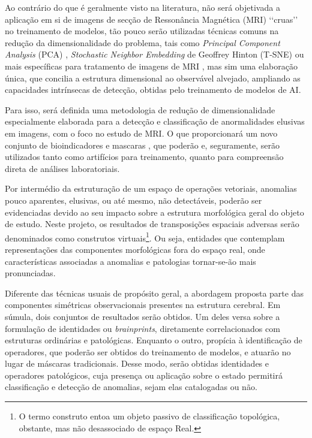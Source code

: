 \documentclass[a4paper, 12pt]{report}
\begin{document}
Ao contrário do que é geralmente visto na literatura, não será objetivada a aplicação em si de imagens de secção de Ressonância Magnética (MRI) {\lq\lq}cruas{\rq\rq} no treinamento de modelos, tão pouco serão utilizadas técnicas comuns na redução da dimensionalidade do problema, tais como \textit{Principal Component Analysis} (PCA) \cite{JolliffePrincipal2016Apr}, \textit{Stochastic Neighbor Embedding} de Geoffrey Hinton (T-SNE) \cite{VanderMaaten2008} ou mais específicas para tratamento de imagens de MRI \cite{Plis2014}, mas sim uma elaboração única, que concilia a estrutura dimensional ao observável alvejado, ampliando as capacidades intrínsecas de detecção, obtidas pelo treinamento de modelos de AI.

Para isso, será definida uma metodologia de redução de dimensionalidade especialmente elaborada para a detecção e classificação de anormalidades elusivas em imagens, com o foco no estudo de MRI. O que proporcionará um novo conjunto de bioindicadores e mascaras \cite{Iqbal2018,Kumar2023, Liu2014}, que poderão e, seguramente, serão utilizados tanto como artifícios para treinamento, quanto para compreensão direta de análises laboratoriais.

Por intermédio da estruturação de um espaço de operações vetoriais, anomalias pouco aparentes, elusivas, ou até mesmo, não detectáveis, poderão ser evidenciadas devido ao seu impacto sobre a estrutura morfológica geral do objeto de estudo. Neste projeto, os resultados de transposições espaciais adversas serão denominados como construtos virtuais\footnote{O termo construto entoa um objeto passivo de classificação topológica, obstante, mas não desassociado de espaço Real.}. Ou seja, entidades que contemplam representações das componentes morfológicas fora do espaço real, onde características associadas a anomalias e patologias tornar-se-ão mais pronunciadas.

Diferente das técnicas usuais de propósito geral, a abordagem proposta parte das componentes simétricas observacionais presentes na estrutura cerebral. Em súmula, dois conjuntos de resultados serão obtidos. Um deles versa sobre a formulação de identidades ou \textit{brainprints}, diretamente correlacionados com estruturas ordinárias e patológicas. Enquanto o outro, propícia à identificação de operadores, que poderão ser obtidos do treinamento de modelos, e atuarão no lugar de máscaras tradicionais. Desse modo, serão obtidas identidades e operadores patológicos, cuja presença ou aplicação sobre o estado permitirá classificação e detecção de anomalias, sejam elas catalogadas ou não. 
\end{document}
